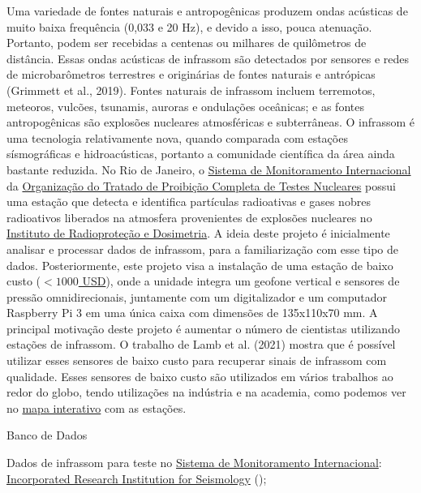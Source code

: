 \documentclass[10pt,a4paper,oneside]{book}
\begin{document}
Uma variedade de fontes naturais e antropogênicas produzem ondas acústicas de muito baixa frequência (0,033 e 20 Hz), e devido a isso, pouca atenuação. Portanto, podem ser recebidas a centenas ou milhares de quilômetros de distância. Essas ondas acústicas de infrassom são detectados por sensores e redes de microbarômetros terrestres e originárias de fontes naturais e antrópicas (Grimmett et al., 2019). Fontes naturais de infrassom incluem terremotos, meteoros, vulcões, tsunamis, auroras e ondulações oceânicas; e as fontes antropogênicas são explosões nucleares atmosféricas e subterrâneas. O infrassom é uma tecnologia relativamente nova, quando comparada com estações sísmográficas e hidroacústicas, portanto a comunidade científica da área ainda bastante reduzida. No Rio de Janeiro, o \href{https://www.ctbto.org/our-work/international-monitoring-system}{Sistema de Monitoramento Internacional} da \href{https://funag.gov.br/biblioteca/download/934-Tratado_de_Proibicao_Completa_dos_Testes_Nucleares_CTBT.pdf}{Organização do Tratado de Proibição Completa de Testes Nucleares} possui uma estação que detecta e identifica partículas radioativas e gases nobres radioativos liberados na atmosfera provenientes de explosões nucleares no \href{https://www.gov.br/ird/pt-br/assuntos/noticias/noticias-2021/ird-sedia-estacao-de-monitoramento-global-capaz-de-detectar-materiais-radioativos-liberados-na-atmosfera}{Instituto de Radioproteção e Dosimetria}. A ideia deste projeto é inicialmente analisar e processar dados de infrassom, para a familiarização com esse tipo de dados. Posteriormente, este projeto visa a instalação de uma estação de baixo custo (\href{https://shop.raspberryshake.org/product/turnkey-iot-atmospheric-infrasound-monitor-rsboom/?attribute_pa_variation=indoor\&attribute_pa_license=private-use-125-discount}{$< 1000$ USD}), onde a unidade integra um geofone vertical e sensores de pressão omnidirecionais, juntamente com um digitalizador e um computador Raspberry Pi 3 em uma única caixa com dimensões de 135x110x70 mm. A principal motivação deste projeto é aumentar o número de cientistas utilizando estações de infrassom. O trabalho de Lamb et al. (2021) mostra que é possível utilizar esses sensores de baixo custo para recuperar sinais de infrassom com qualidade. Esses sensores de baixo custo são utilizados em vários trabalhos ao redor do globo, tendo utilizações na indústria e na academia, como podemos ver no \href{https://stationview.raspberryshake.org/}{mapa interativo} com as estações. 

\begin{fancyenum}{\faDatabase}{Banco de Dados}
	\item Dados de infrassom para teste no \href{https://www.ctbto.org/our-work/international-monitoring-system}{Sistema de Monitoramento Internacional}: \href{https://ds.iris.edu/gmap/\#network=IM\&planet=earth}{Incorporated Research Institution for Seismology} (\faUnlock);
\end{fancyenum}
\end{document}
